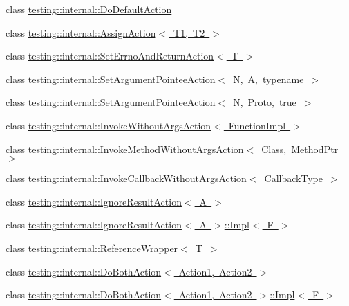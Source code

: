 \begin{DoxyCompactItemize}
class \mbox{\hyperlink{classtesting_1_1internal_1_1_do_default_action}{testing\+::internal\+::\+Do\+Default\+Action}}
\item 
class \mbox{\hyperlink{classtesting_1_1internal_1_1_assign_action}{testing\+::internal\+::\+Assign\+Action$<$ T1, T2 $>$}}
\item 
class \mbox{\hyperlink{classtesting_1_1internal_1_1_set_errno_and_return_action}{testing\+::internal\+::\+Set\+Errno\+And\+Return\+Action$<$ T $>$}}
\item 
class \mbox{\hyperlink{structtesting_1_1internal_1_1_set_argument_pointee_action}{testing\+::internal\+::\+Set\+Argument\+Pointee\+Action$<$ N, A, typename $>$}}
\item 
class \mbox{\hyperlink{classtesting_1_1internal_1_1_set_argument_pointee_action_3_01_n_00_01_proto_00_01true_01_4}{testing\+::internal\+::\+Set\+Argument\+Pointee\+Action$<$ N, Proto, true $>$}}
\item 
class \mbox{\hyperlink{structtesting_1_1internal_1_1_invoke_without_args_action}{testing\+::internal\+::\+Invoke\+Without\+Args\+Action$<$ Function\+Impl $>$}}
\item 
class \mbox{\hyperlink{structtesting_1_1internal_1_1_invoke_method_without_args_action}{testing\+::internal\+::\+Invoke\+Method\+Without\+Args\+Action$<$ Class, Method\+Ptr $>$}}
\item 
class \mbox{\hyperlink{classtesting_1_1internal_1_1_invoke_callback_without_args_action}{testing\+::internal\+::\+Invoke\+Callback\+Without\+Args\+Action$<$ Callback\+Type $>$}}
\item 
class \mbox{\hyperlink{classtesting_1_1internal_1_1_ignore_result_action}{testing\+::internal\+::\+Ignore\+Result\+Action$<$ A $>$}}
\item 
class \mbox{\hyperlink{classtesting_1_1internal_1_1_ignore_result_action_1_1_impl}{testing\+::internal\+::\+Ignore\+Result\+Action$<$ A $>$\+::\+Impl$<$ F $>$}}
\item 
class \mbox{\hyperlink{classtesting_1_1internal_1_1_reference_wrapper}{testing\+::internal\+::\+Reference\+Wrapper$<$ T $>$}}
\item 
class \mbox{\hyperlink{classtesting_1_1internal_1_1_do_both_action}{testing\+::internal\+::\+Do\+Both\+Action$<$ Action1, Action2 $>$}}
\item 
class \mbox{\hyperlink{classtesting_1_1internal_1_1_do_both_action_1_1_impl}{testing\+::internal\+::\+Do\+Both\+Action$<$ Action1, Action2 $>$\+::\+Impl$<$ F $>$}}
\end{DoxyCompactItemize}
